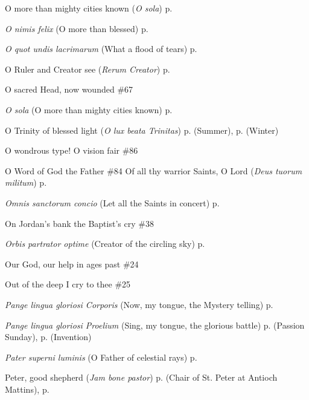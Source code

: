 \begin{hangparas}{1.25em}{1}
O more than mighty cities known (\textit{O sola}) \dotfill p. \pageref{EpiphanyMattins}
\par\noindent
\textit{O nimis felix} (O more than blessed) \dotfill p. \pageref{JohnBaptistMattins}
\par\noindent
\textit{O quot undis lacrimarum} (What a flood of tears) \dotfill p. \pageref{SevenSorrowsInvitatory}
\par\noindent
O Ruler and Creator see (\textit{Rerum Creator}) \dotfill p. \pageref{WednesdayInvitatory}
\par\noindent
O sacred Head, now wounded  \dotfill \#67
\par\noindent
\textit{O sola} (O more than mighty cities known) \dotfill p. \pageref{EpiphanyMattins}
\par\noindent
O Trinity of blessed light (\textit{O lux beata Trinitas}) \dotfill p. \pageref{SaturdayEvensongSummer} (Summer), p. \pageref{SaturdayEvensongWinter} (Winter)
\par\noindent
O wondrous type! O vision fair \dotfill \#86
\par\noindent
O Word of God the Father \dotfill \#84
Of all thy warrior Saints, O Lord (\textit{Deus tuorum militum}) \dotfill p. \pageref{StephenEvensong}
\par\noindent
\textit{Omnis sanctorum concio} (Let all the Saints in concert) \dotfill p. \pageref{AnneEvensongII}
\par\noindent
On Jordan's bank the Baptist's cry \dotfill \#38
\par\noindent
\textit{Orbis partrator optime} (Creator of the circling sky) \dotfill p. \pageref{GuardianAngelsMattins}
\par\noindent
Our God, our help in ages past \dotfill \#24
\par\noindent
Out of the deep I cry to thee \dotfill \#25
\par\noindent
\textit{Pange lingua gloriosi Corporis} (Now, my tongue, the Mystery telling) \dotfill p. \pageref{CorpusChristiEvensong}
\par\noindent
\textit{Pange lingua gloriosi Proelium} (Sing, my tongue, the glorious battle) \dotfill p. \pageref{PassionSundayInvitatory} (Passion Sunday), p. \pageref{InventionInvitatory} (Invention)
\par\noindent
\textit{Pater superni luminis} (O Father of celestial rays) \dotfill p. \pageref{MaryMagdaleneEvensong}
\par\noindent
Peter, good shepherd (\textit{Jam bone pastor}) \dotfill p. \pageref{PeterAntiochMattins} (Chair of St. Peter at Antioch Mattins), p. \pageref{PeterMattins}

\end{hangparas}
